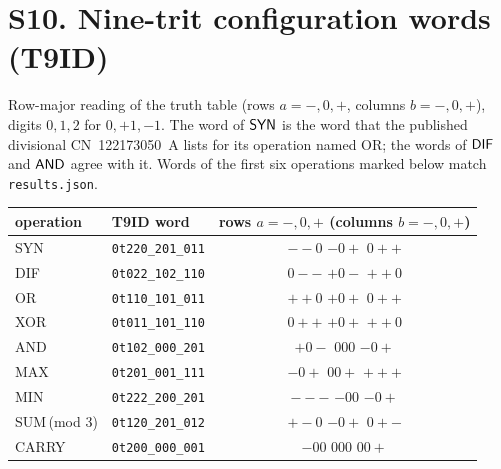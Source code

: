 \documentclass[10pt,a4paper]{article}
\begin{document}
\section*{S10. Nine-trit configuration words (T9ID)}
Row-major reading of the truth table (rows $a=-,0,+$, columns $b=-,0,+$), digits $0,1,2$ for $0,+1,-1$. The word of $\mathsf{SYN}$ is the word that the published divisional CN~122173050~A lists for its operation named OR; the words of $\mathsf{DIF}$ and $\mathsf{AND}$ agree with it. Words of the first six operations marked below match \texttt{results.json}.
\begin{center}\small\begin{tabular}{llc}\toprule operation&T9ID word&rows $a=-,0,+$ (columns $b=-,0,+$)\\\midrule
\textsf{SYN}&\texttt{0t220\_201\_011}&$--0$ $-0+$ $0++$\\
\textsf{DIF}&\texttt{0t022\_102\_110}&$0--$ $+0-$ $++0$\\
\textsf{OR}&\texttt{0t110\_101\_011}&$++0$ $+0+$ $0++$\\
\textsf{XOR}&\texttt{0t011\_101\_110}&$0++$ $+0+$ $++0$\\
\textsf{AND}&\texttt{0t102\_000\_201}&$+0-$ $000$ $-0+$\\
\textsf{MAX}&\texttt{0t201\_001\_111}&$-0+$ $00+$ $+++$\\
\textsf{MIN}&\texttt{0t222\_200\_201}&$---$ $-00$ $-0+$\\
\textsf{SUM\,(mod 3)}&\texttt{0t120\_201\_012}&$+-0$ $-0+$ $0+-$\\
\textsf{CARRY}&\texttt{0t200\_000\_001}&$-00$ $000$ $00+$\\
\bottomrule\end{tabular}\end{center}
\end{document}
